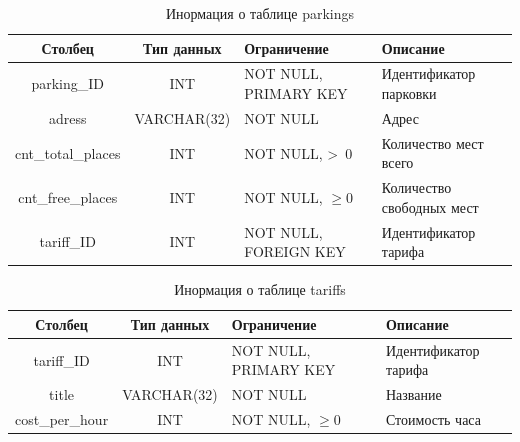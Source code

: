 \begin{table}[H]
	\begin{center}
		\begin{center}
			\caption{\label{tab:parkings}Инормация о таблице parkings}
		\end{center}
		\begin{tabular}{|c|c|p{3cm}|p{4cm}|}
			\hline 
			Столбец & Тип данных & Ограничение & Описание \\ \hline
			parking\_ID & INT & NOT NULL, PRIMARY KEY & Идентификатор
парковки \\ \hline
	        adress &  VARCHAR(32)  & NOT NULL & Адрес  \\ \hline
	        cnt\_total\_places &  INT & NOT NULL, >~0 & Количество мест всего \\ \hline
	        cnt\_free\_places & INT & NOT NULL, \( \geq 0\) & Количество свободных мест  \\ \hline
	        tariff\_ID & INT & NOT NULL, FOREIGN KEY & Идентификатор тарифа \\ \hline
		\end{tabular}
	\end{center}
\end{table}

\begin{table}[H]
	\begin{center}
		\begin{center}
			\caption{\label{tab:tariffs}Инормация о таблице tariffs}
		\end{center}
		\begin{tabular}{|c|c|p{3cm}|p{4cm}|}
			\hline 
			Столбец & Тип данных & Ограничение & Описание \\ \hline
			tariff\_ID & INT & NOT NULL, PRIMARY KEY & Идентификатор тарифа \\ \hline
	        title &  VARCHAR(32)  & NOT NULL & Название  \\ \hline
	        cost\_per\_hour & INT & NOT NULL, \( \geq 0\) & Стоимость часа  \\ \hline
		\end{tabular}
	\end{center}
\end{table}

